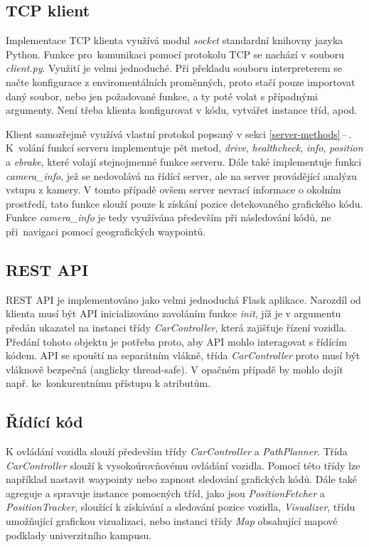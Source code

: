 \documentclass[czech, bachelor]{diploma}
\newcommand{\peteref}[1]{\ref{#1}\,--\,\nameref{#1}}
\begin{document}
\subsection{TCP klient}

Implementace TCP klienta využívá modul \emph{socket} standardní knihovny jazyka Python. Funkce pro~komunikaci pomocí protokolu TCP
se nachází v souboru \emph{client.py}. Využití je velmi jednoduché. Při překladu souboru interpreterem se načte konfigurace
z enviromentálních proměnných, proto stačí pouze importovat daný soubor, nebo jen požadované funkce, a ty poté volat s případnými
argumenty. Není třeba klienta konfigurovat v kódu, vytvářet instance tříd, apod.

Klient samozřejmě využívá vlastní protokol popsaný v sekci \peteref{server-methods}. K~volání funkcí serveru implementuje pět
metod, \emph{drive}, \emph{healthcheck}, \emph{info}, \emph{position} a \emph{ebrake}, které volají stejnojmenné funkce serveru.
Dále také implementuje funkci \emph{camera\_info}, jež se nedovolává na řídící server, ale na server provádějící analýzu vstupu
z kamery. V tomto případě ovšem server nevrací informace o okolním prostředí, tato funkce slouží pouze k získání pozice
detekovaného grafického kódu. Funkce \emph{camera\_info} je tedy využívána především při následování kódů, ne při~navigaci pomocí
geografických waypointů.

\subsection{REST API}

REST API je implementováno jako velmi jednoduchá Flask \cite{flask-source} aplikace. Narozdíl od klienta musí být API
inicializováno zavoláním funkce \emph{init}, jíž je v argumentu předán ukazatel na instanci třídy \emph{CarController}, která
zajišťuje řízení vozidla. Předání tohoto objektu je potřeba proto, aby API mohlo interagovat s řídícím kódem. API se spouští
na separátním vlákně, třída \emph{CarController} proto musí být vláknově bezpečná (anglicky thread-safe). V opačném případě
by mohlo dojít např. ke~konkurentnímu přístupu k atributům.

\subsection{Řídící kód}

K ovládání vozidla slouží především třídy \emph{CarController} a \emph{PathPlanner}. Třída \emph{CarController} slouží
k vysokoúrovňovému ovládání vozidla. Pomocí této třídy lze například nastavit waypointy nebo zapnout sledování grafických kódů.
Dále také agreguje a spravuje instance pomocných tříd, jako jsou \emph{PositionFetcher} a \emph{PositionTracker}, sloužící
k získávání a sledování pozice vozidla, \emph{Visualizer}, třídu umožňující grafickou vizualizaci, nebo instanci třídy \emph{Map}
obsahující mapové podklady univerzitního kampusu.
\end{document}
